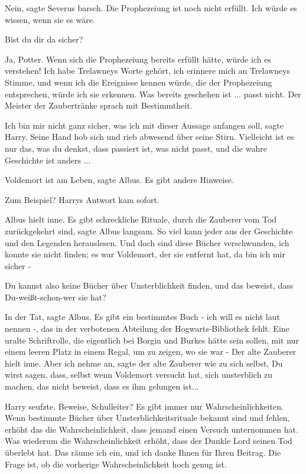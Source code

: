 \glqq{}Nein\grqq{}, sagte Severus barsch. \glqq{}Die Prophezeiung ist noch nicht
erfüllt. Ich würde es wissen, wenn sie es wäre.\grqq{}

\glqq{}Bist du dir da sicher?\grqq{}

\glqq{}Ja, Potter. Wenn sich die Prophezeiung bereits erfüllt hätte, würde ich es
verstehen! Ich habe Trelawneys Worte gehört, ich erinnere mich an Trelawneys
Stimme, und wenn ich die Ereignisse kennen würde, die der Prophezeiung
entsprechen, würde ich sie erkennen. Was bereits geschehen ist ... passt
nicht.\grqq{} Der Meister der Zaubertränke sprach mit Bestimmtheit.

\glqq{}Ich bin mir nicht ganz sicher, was ich mit dieser Aussage anfangen
soll\grqq{}, sagte Harry. Seine Hand hob sich und rieb abwesend über seine
Stirn. \glqq{}Vielleicht ist es nur das, was du denkst, dass passiert ist, was
nicht passt, und die wahre Geschichte ist anders ...\grqq{}

\glqq{}Voldemort ist am Leben\grqq{}, sagte Albus. \glqq{}Es gibt andere
Hinweise.\grqq{}

\glqq{}Zum Beispiel?\grqq{} Harrys Antwort kam sofort.

Albus hielt inne. \glqq{}Es gibt schreckliche Rituale, durch die Zauberer vom Tod
zurückgekehrt sind\grqq{}, sagte Albus langsam. \glqq{}So viel kann jeder aus der
Geschichte und den Legenden herauslesen. Und doch sind diese Bücher
verschwunden, ich konnte sie nicht finden; es war Voldemort, der sie entfernt
hat, da bin ich mir sicher -\grqq{}

\glqq{}Du kannst also keine Bücher über Unsterblichkeit finden, und das beweist,
dass Du-weißt-schon-wer sie hat?\grqq{}

\glqq{}In der Tat\grqq{}, sagte Albus. \glqq{}Es gibt ein bestimmtes Buch - ich
will es nicht laut nennen -, das in der verbotenen Abteilung der
Hogwarts-Bibliothek fehlt. Eine uralte Schriftrolle, die eigentlich bei Borgin
und Burkes hätte sein sollen, mit nur einem leeren Platz in einem Regal, um zu
zeigen, wo sie war -\grqq{} Der alte Zauberer hielt inne. \glqq{}Aber ich nehme
an\grqq{}, sagte der alte Zauberer wie zu sich selbst, \glqq{}Du wirst sagen,
dass, selbst wenn Voldemort versucht hat, sich unsterblich zu machen, das nicht
beweist, dass es ihm gelungen ist...\grqq{}

Harry seufzte. \glqq{}Beweise, Schulleiter? Es gibt immer nur
Wahrscheinlichkeiten. Wenn bestimmte Bücher über Unsterblichkeitsrituale bekannt
sind und fehlen, erhöht das die Wahrscheinlichkeit, dass jemand einen Versuch
unternommen hat. Was wiederum die Wahrscheinlichkeit erhöht, dass der Dunkle
Lord seinen Tod überlebt hat. Das räume ich ein, und ich danke Ihnen für Ihren
Beitrag. Die Frage ist, ob die vorherige Wahrscheinlichkeit hoch genug
ist.\grqq{}


